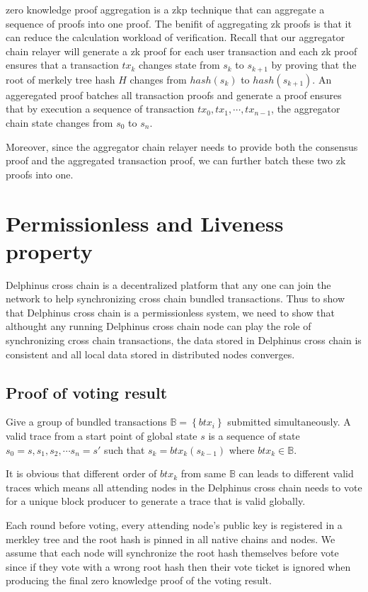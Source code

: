\documentclass[pageno]{jpaper}
\begin{document}
zero knowledge proof aggregation is a zkp technique that can aggregate a sequence of proofs into one proof. The benifit of aggregating zk proofs is that it can reduce the calculation workload of verification. Recall that our aggregator chain relayer will generate a zk proof for each user transaction and each zk proof ensures that a transaction $tx_k$ changes state from $s_k$ to $s_{k+1}$ by proving that the root of merkely tree hash $H$ changes from $hash(s_k)$ to $hash(s_{k+1})$. An aggeregated proof batches all transaction proofs and generate a proof ensures that by execution a sequence of transaction $tx_0, tx_1, \cdots, tx_{n-1}$, the aggregator chain state changes from $s_0$ to $s_n$. 

Moreover, since the aggregator chain relayer needs to provide both the consensus proof and the aggregated transaction proof, we can further batch these two zk proofs into one.


\section {Permissionless and Liveness property}
\label{permissionless-liveness}

Delphinus cross chain is a decentralized platform that any one can join the network to help synchronizing cross chain bundled transactions. Thus to show that Delphinus cross chain is a permissionless system, we need to show that althought any running Delphinus cross chain node can play the role of synchronizing cross chain transactions, the data stored in Delphinus cross chain is consistent and all local data stored in distributed nodes converges.

\subsection{Proof of voting result}
Give a group of bundled transactions $\mathbb{B} = \left\{btx_i\right\}$ submitted simultaneously. A valid trace from a start point of global state $s$ is a sequence of state $s_0=s, s_1, s_2, \cdots s_n = s'$ such that $s_k = btx_k(s_{k-1})$ where $btx_k \in \mathbb{B}$.

It is obvious that different order of $btx_k$ from same $\mathbb{B}$ can leads to different valid traces which means all attending nodes in the Delphinus cross chain needs to vote for a unique block producer to generate a trace that is valid globally.

Each round before voting, every attending node's public key is registered in a merkley tree and the root hash is pinned in all native chains and nodes. We assume that each node will synchronize the root hash themselves before vote since if they vote with a wrong root hash then their vote ticket is ignored when producing the final zero knowledge proof of the voting result.
\end{document}
